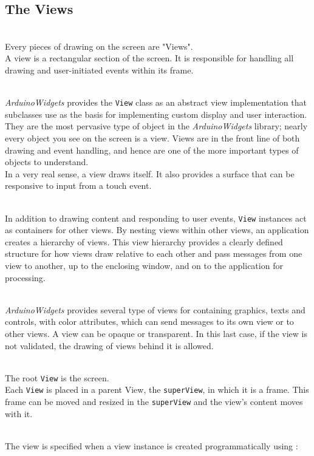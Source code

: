 \documentclass[a4paper,11pt]{extarticle}
\begin{document}
\newpage
\subsection{The Views}

~\\ Every pieces of drawing on the screen are "Views".
~\\ A view is a rectangular section of the screen. It is responsible for handling all drawing and user-initiated events within its frame.

~\\ \emph{ArduinoWidgets} provides the \texttt{View} class as an abstract view implementation that subclasses use as the basis for implementing custom display and user interaction. They are the most pervasive type of object in the \emph{ArduinoWidgets} library; nearly every object you see on the screen is a view. Views are in the front line of both drawing and event handling, and hence are one of the more important types of objects to understand.
~\\ In a very real sense, a view draws itself. It also provides a surface that can be responsive to input from a touch event.

~\\ In addition to drawing content and responding to user events, \texttt{View} instances act as containers for other views. By nesting views within other views, an application creates a hierarchy of views. This view hierarchy provides a clearly defined structure for how views draw relative to each other and pass messages from one view to another, up to the enclosing window, and on to the application for processing.

~\\ \emph{ArduinoWidgets} provides several type of views for containing graphics, texts and controls, with color attributes, which can send messages to its own view or to other views. A view can be opaque or transparent. In this last case, if the view is not validated, the drawing of views behind it is allowed.

~\\ The root \texttt{View} is the screen.
~\\ Each \texttt{View} is placed in a parent View, the \texttt{superView}, in which it is a frame. This frame can be moved and resized in the \texttt{superView} and the view's content moves with it.

~\\ The view is specified when a view instance is created programmatically using :
\end{document}
